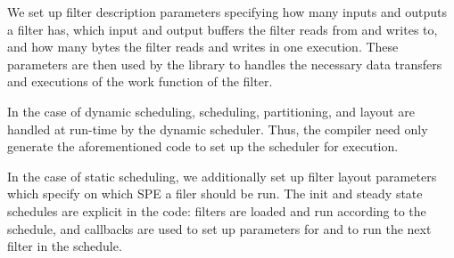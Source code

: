 We set up filter description parameters
specifying how many inputs and outputs a filter has, which input and output
buffers the filter reads from and writes to, and how many bytes the filter 
reads and writes in one execution. These parameters are then used by the
library to handles the necessary data transfers and executions of the
work function of the filter. 

In the case of dynamic scheduling, scheduling, partitioning, and layout
are handled at run-time by the dynamic scheduler. Thus, the compiler need only
generate the aforementioned code to set up the scheduler for execution.

In the case of static scheduling, we additionally set up filter layout parameters
which specify on which SPE a filer should be run. The init and steady state
schedules are explicit in the code: filters are loaded and run according to the
schedule, and callbacks are used to set up parameters for and to run the next filter in
the schedule.

